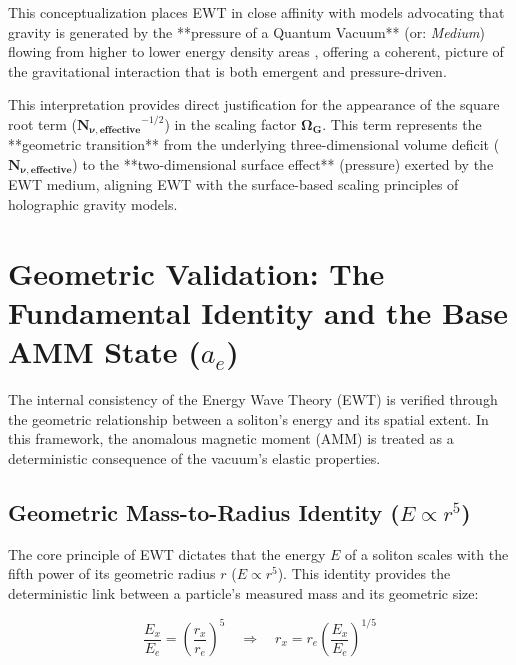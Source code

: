\documentclass[10pt,a4paper]{article}
\begin{document}
This conceptualization places EWT in close affinity with models advocating that gravity is generated by the **pressure of a Quantum Vacuum** (or: \textit{Medium}) flowing from higher to lower energy density areas \cite{daywitt2015pressure}, offering a coherent, picture of the gravitational interaction that is both emergent and pressure-driven.

This interpretation provides direct justification for the appearance of the square root term ($\mathbf{N_{\nu, \text{effective}}}^{-1/2}$) in the scaling factor $\mathbf{\Omega_G}$. This term represents the **geometric transition** from the underlying three-dimensional volume deficit ($\mathbf{N_{\nu, \text{effective}}}$) to the **two-dimensional surface effect** (pressure) exerted by the EWT medium, aligning EWT with the surface-based scaling principles of holographic gravity models.


\section{Geometric Validation: The Fundamental Identity and the Base AMM State ($a_e$)}
\label{sec:geom_validation}

The internal consistency of the Energy Wave Theory (EWT) is verified through the geometric relationship between a soliton's energy and its spatial extent. In this framework, the anomalous magnetic moment (AMM) is treated as a deterministic consequence of the vacuum's elastic properties.

\subsection{Geometric Mass-to-Radius Identity ($E \propto r^5$)}
\label{sec:geometric_mass_to_radius}

The core principle of EWT \cite{yee2014leptons, yee2019masscharge} dictates that the energy $E$ of a soliton scales with the fifth power of its geometric radius $r$ ($E \propto r^5$). This identity provides the deterministic link between a particle's measured mass and its geometric size:

\begin{equation}
	\frac{E_x}{E_e} = \left(\frac{r_x}{r_e}\right)^{5}
	\quad\Longrightarrow\quad
	r_x = r_e \left(\frac{E_x}{E_e}\right)^{1/5}
	\label{eq:mass_to_radius_id}
\end{equation}
\end{document}
